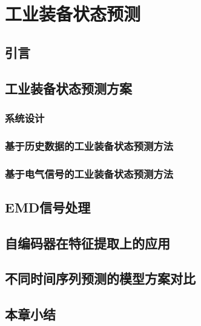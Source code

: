 

\chapter{工业装备状态预测}
\section{引言}

\section{工业装备状态预测方案}
\subsection{系统设计}
\subsection{基于历史数据的工业装备状态预测方法}
\subsection{基于电气信号的工业装备状态预测方法}

\section{EMD信号处理}
\section{自编码器在特征提取上的应用}
\section{不同时间序列预测的模型方案对比}
\section{本章小结}